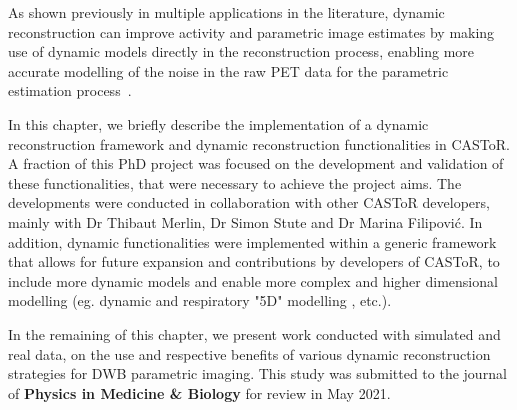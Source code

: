 As shown previously in multiple applications in the literature, dynamic reconstruction can improve activity and parametric image estimates by making use of dynamic models directly in the reconstruction process, enabling more accurate modelling of the noise in the raw PET data for the parametric estimation process~\cite{Reader2014}. 

In this chapter, we briefly describe the implementation of a dynamic reconstruction framework and dynamic reconstruction functionalities in CASToR. A fraction of this PhD project was focused on the development and validation of these functionalities, that were necessary to achieve the project aims. The developments were conducted in collaboration with other CASToR developers, mainly with Dr Thibaut Merlin, Dr Simon Stute and Dr Marina Filipović.
In addition, dynamic functionalities were implemented within a generic framework that allows for future expansion and contributions by developers of CASToR, to include more dynamic models and enable more complex and higher dimensional modelling (eg. dynamic and respiratory "5D" modelling , etc.).

In the remaining of this chapter, we present work conducted with simulated and real data, on the use and respective benefits of various dynamic reconstruction strategies for DWB parametric imaging. This study was submitted to the journal of \textbf{Physics in Medicine \& Biology} for review in May 2021. 


